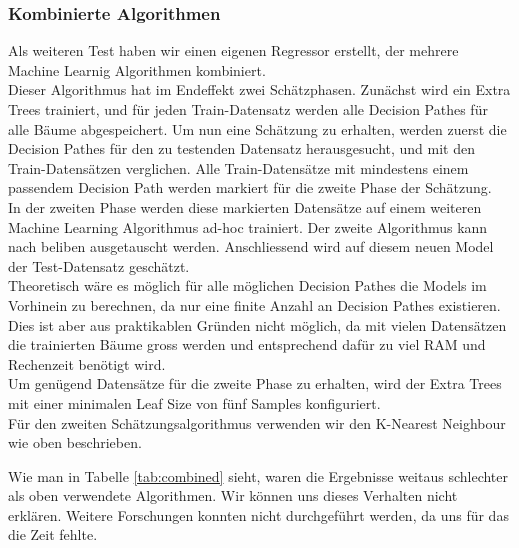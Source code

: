 \subsubsection{Kombinierte Algorithmen}
Als weiteren Test haben wir einen eigenen Regressor erstellt, der mehrere Machine Learnig Algorithmen kombiniert.\\[2ex]
%
Dieser Algorithmus hat im Endeffekt zwei Schätzphasen. Zunächst wird ein Extra Trees trainiert, und für jeden Train-Datensatz werden alle Decision Pathes für alle Bäume abgespeichert. Um nun eine Schätzung zu erhalten, werden zuerst die Decision Pathes für den zu testenden Datensatz herausgesucht, und mit den Train-Datensätzen verglichen. Alle Train-Datensätze mit mindestens einem passendem Decision Path werden markiert für die zweite Phase der Schätzung.\\
In der zweiten Phase werden diese markierten Datensätze auf einem weiteren Machine Learning Algorithmus ad-hoc trainiert. Der zweite Algorithmus kann nach beliben ausgetauscht werden. Anschliessend wird auf diesem neuen Model der Test-Datensatz geschätzt.\\
Theoretisch wäre es möglich für alle möglichen Decision Pathes die Models im Vorhinein zu berechnen, da nur eine finite Anzahl an Decision Pathes existieren. Dies ist aber aus praktikablen Gründen nicht möglich, da mit vielen Datensätzen die trainierten Bäume gross werden und entsprechend  dafür zu viel RAM und Rechenzeit benötigt wird.\\[2ex]
%
Um genügend Datensätze für die zweite Phase zu erhalten, wird der Extra Trees mit einer minimalen Leaf Size von fünf Samples konfiguriert.\\
Für den zweiten Schätzungsalgorithmus verwenden wir den K-Nearest Neighbour wie oben beschrieben.
%
\begin{table}[ht]
\centering
{}
\caption{Ergebnisse eigen entwickelter Algorithmus}
\label{tab:combined}
\end{table}
%
Wie man in Tabelle \ref{tab:combined} sieht, waren die Ergebnisse weitaus schlechter als oben verwendete Algorithmen. Wir können uns dieses Verhalten nicht erklären. Weitere Forschungen konnten nicht durchgeführt werden, da uns für das die Zeit fehlte.\\[2ex]
